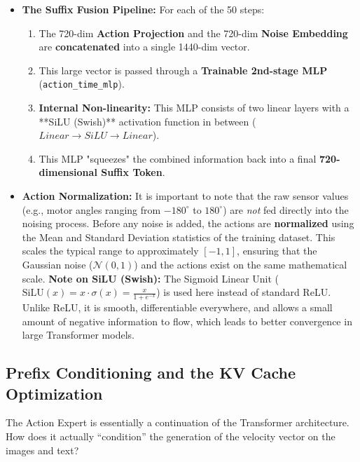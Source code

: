\documentclass[11pt,a4paper]{article}
\begin{document}
\begin{itemize}
    \item \textbf{The Suffix Fusion Pipeline:} For each of the 50 steps:
    \begin{enumerate}
        \item The 720-dim \textbf{Action Projection} and the 720-dim \textbf{Noise Embedding} are \textbf{concatenated} into a single 1440-dim vector.
        \item This large vector is passed through a \textbf{Trainable 2nd-stage MLP} (\texttt{action\_time\_mlp}).
        \item \textbf{Internal Non-linearity:} This MLP consists of two linear layers with a **SiLU (Swish)** activation function in between ($Linear \rightarrow SiLU \rightarrow Linear$).
        \item This MLP "squeezes" the combined information back into a final \textbf{720-dimensional Suffix Token}.
    \end{enumerate}
    \item \textbf{Action Normalization:} It is important to note that the raw sensor values (e.g., motor angles ranging from $-180^\circ$ to $180^\circ$) are \textit{not} fed directly into the noising process. Before any noise is added, the actions are \textbf{normalized} using the Mean and Standard Deviation statistics of the training dataset. This scales the typical range to approximately $[-1, 1]$, ensuring that the Gaussian noise ($\mathcal{N}(0, 1)$) and the actions exist on the same mathematical scale.
    \textbf{Note on SiLU (Swish):} The Sigmoid Linear Unit (\(\text{SiLU}(x) = x \cdot \sigma(x) = \frac{x}{1 + e^{-x}}\)) is used here instead of standard ReLU. Unlike ReLU, it is smooth, differentiable everywhere, and allows a small amount of negative information to flow, which leads to better convergence in large Transformer models.
\end{itemize}

\subsection{Prefix Conditioning and the KV Cache Optimization}
The Action Expert is essentially a continuation of the Transformer architecture. How does it actually ``condition'' the generation of the velocity vector on the images and text? 
\end{document}
